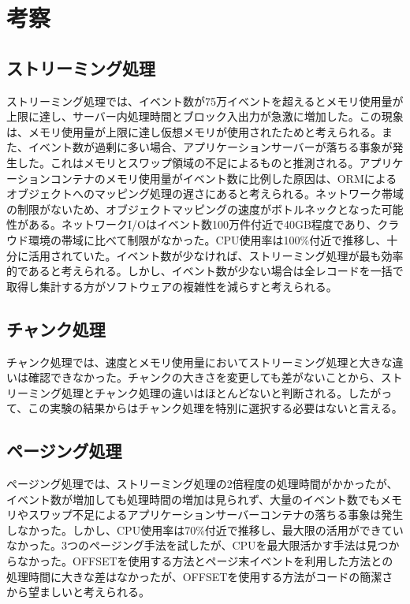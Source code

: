 \documentclass[../../main]{subfiles}
\begin{document}
    \section{考察}\label{sec:consideration}

    \subsection{ストリーミング処理}\label{subsec:consideration-streaming}

    ストリーミング処理では、イベント数が75万イベントを超えるとメモリ使用量が上限に達し、サーバー内処理時間とブロック入出力が急激に増加した。この現象は、メモリ使用量が上限に達し仮想メモリが使用されたためと考えられる。また、イベント数が過剰に多い場合、アプリケーションサーバーが落ちる事象が発生した。これはメモリとスワップ領域の不足によるものと推測される。アプリケーションコンテナのメモリ使用量がイベント数に比例した原因は、ORMによるオブジェクトへのマッピング処理の遅さにあると考えられる。ネットワーク帯域の制限がないため、オブジェクトマッピングの速度がボトルネックとなった可能性がある。ネットワークI/Oはイベント数100万件付近で40GB程度であり、クラウド環境の帯域に比べて制限がなかった。CPU使用率は100\%付近で推移し、十分に活用されていた。イベント数が少なければ、ストリーミング処理が最も効率的であると考えられる。しかし、イベント数が少ない場合は全レコードを一括で取得し集計する方がソフトウェアの複雑性を減らすと考えられる。

    \subsection{チャンク処理}\label{subsec:consideration-chunk}

    チャンク処理では、速度とメモリ使用量においてストリーミング処理と大きな違いは確認できなかった。チャンクの大きさを変更しても差がないことから、ストリーミング処理とチャンク処理の違いはほとんどないと判断される。したがって、この実験の結果からはチャンク処理を特別に選択する必要はないと言える。

    \subsection{ページング処理}\label{subsec:consideration-paging}

    ページング処理では、ストリーミング処理の2倍程度の処理時間がかかったが、イベント数が増加しても処理時間の増加は見られず、大量のイベント数でもメモリやスワップ不足によるアプリケーションサーバーコンテナの落ちる事象は発生しなかった。しかし、CPU使用率は70\%付近で推移し、最大限の活用ができていなかった。3つのページング手法を試したが、CPUを最大限活かす手法は見つからなかった。OFFSETを使用する方法とページ末イベントを利用した方法との処理時間に大きな差はなかったが、OFFSETを使用する方法がコードの簡潔さから望ましいと考えられる。
\end{document}
